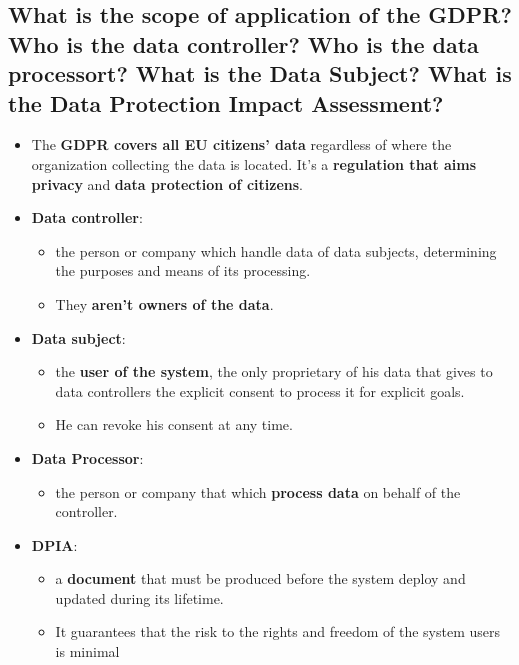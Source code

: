 \documentclass[9pt, letterpaper]{article}
\begin{document}
\subsection{What is the scope of application of the GDPR? Who is the data controller? Who is the data processort? What is the Data Subject? What is the Data Protection Impact Assessment?}
\begin{itemize}
	\item The \textbf{GDPR covers all EU citizens' data} regardless of where the organization collecting the data is located. It's a \textbf{regulation that aims privacy} and \textbf{data protection of citizens}.
	\item \textbf{Data controller}:
	      \begin{itemize}
		      \item the person or company which handle data of data subjects, determining the purposes and means of its processing.
		      \item They \textbf{aren't owners of the data}.
	      \end{itemize}
	\item \textbf{Data subject}:
	      \begin{itemize}
		      \item the \textbf{user of the system}, the only proprietary of his data that gives to data controllers the explicit consent to process it for explicit goals.
		      \item He can revoke his consent at any time.
	      \end{itemize}
	\item \textbf{Data Processor}:
	      \begin{itemize}
		      \item the person or company that which \textbf{process data} on behalf of the controller.
	      \end{itemize}
	\item \textbf{DPIA}:
	      \begin{itemize}
		      \item a \textbf{document} that must be produced before the system deploy and updated during its lifetime.
		      \item It guarantees that the risk to the rights and freedom of the system users is minimal
	      \end{itemize}
\end{itemize}
\end{document}
